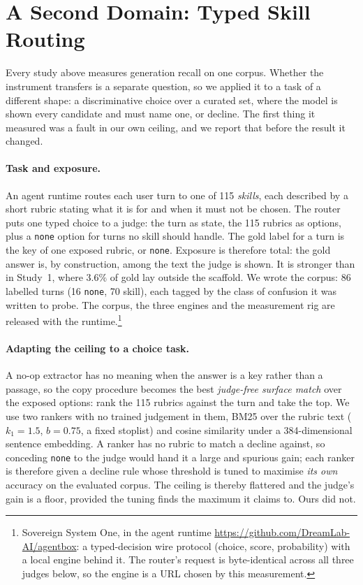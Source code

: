 \section{A Second Domain: Typed Skill Routing}\label{sec:routing}
Every study above measures generation recall on one corpus. Whether the instrument transfers is a separate question, so we applied it to a task of a different shape: a discriminative choice over a curated set, where the model is shown every candidate and must name one, or decline. The first thing it measured was a fault in our own ceiling, and we report that before the result it changed.

\paragraph{Task and exposure.} An agent runtime routes each user turn to one of 115 \emph{skills}, each described by a short rubric stating what it is for and when it must not be chosen. The router puts one typed choice to a judge: the turn as state, the 115 rubrics as options, plus a \texttt{none} option for turns no skill should handle. The gold label for a turn is the key of one exposed rubric, or \texttt{none}. Exposure is therefore total: the gold answer is, by construction, among the text the judge is shown. It is stronger than in Study~1, where $3.6\%$ of gold lay outside the scaffold. We wrote the corpus: 86 labelled turns (16 \texttt{none}, 70 skill), each tagged by the class of confusion it was written to probe. The corpus, the three engines and the measurement rig are released with the runtime.\footnote{Sovereign System One, in the agent runtime \url{https://github.com/DreamLab-AI/agentbox}: a typed-decision wire protocol (choice, score, probability) with a local engine behind it. The router's request is byte-identical across all three judges below, so the engine is a URL chosen by this measurement.}

\paragraph{Adapting the ceiling to a choice task.} A no-op extractor has no meaning when the answer is a key rather than a passage, so the copy procedure becomes the best \emph{judge-free surface match} over the exposed options: rank the 115 rubrics against the turn and take the top. We use two rankers with no trained judgement in them, BM25 over the rubric text ($k_1{=}1.5$, $b{=}0.75$, a fixed stoplist) and cosine similarity under a 384-dimensional sentence embedding. A ranker has no rubric to match a decline against, so conceding \texttt{none} to the judge would hand it a large and spurious gain; each ranker is therefore given a decline rule whose threshold is tuned to maximise \emph{its own} accuracy on the evaluated corpus. The ceiling is thereby flattered and the judge's gain is a floor, provided the tuning finds the maximum it claims to. Ours did not.

